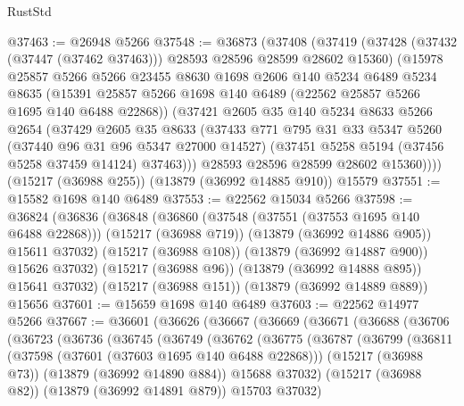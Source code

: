 \begin{lexlean}{RustStd}
\begin{coremodule}
@37463 := @26948 @5266
@37548 := @36873
    (@37408
      (@37419
        (@37428 (@37432 (@37447 (@37462 @37463))) @28593 @28596 @28599 @28602 @15360)
        (@15978
          @25857
          @5266
          @5266
          @23455
          @8630
          @1698
          @2606
          @140
          @5234
          @6489
          @5234
          @8635
          (@15391 @25857 @5266 @1698 @140 @6489 (@22562 @25857 @5266 @1695 @140 @6488 @22868))
          (@37421
            @2605
            @35
            @140
            @5234
            @8633
            @5266
            @2654
            (@37429
              @2605
              @35
              @8633
              (@37433
                @771
                @795
                @31
                @33
                @5347
                @5260
                (@37440 @96 @31 @96 @5347 @27000 @14527)
                (@37451 @5258 @5194 (@37456 @5258 @37459 @14124) @37463)))
            @28593
            @28596
            @28599
            @28602
            @15360))))
    (@15217 (@36988 @255))
    (@13879 (@36992 @14885 @910))
    @15579
@37551 := @15582 @1698 @140 @6489
@37553 := @22562 @15034 @5266
@37598 := @36824
    (@36836
      (@36848
        (@36860
          (@37548 (@37551 (@37553 @1695 @140 @6488 @22868)))
          (@15217 (@36988 @719))
          (@13879 (@36992 @14886 @905))
          @15611
          @37032)
        (@15217 (@36988 @108))
        (@13879 (@36992 @14887 @900))
        @15626
        @37032)
      (@15217 (@36988 @96))
      (@13879 (@36992 @14888 @895))
      @15641
      @37032)
    (@15217 (@36988 @151))
    (@13879 (@36992 @14889 @889))
    @15656
@37601 := @15659 @1698 @140 @6489
@37603 := @22562 @14977 @5266
@37667 := @36601
    (@36626
      (@36667
        (@36669
          (@36671
            (@36688
              (@36706
                (@36723
                  (@36736
                    (@36745
                      (@36749
                        (@36762
                          (@36775
                            (@36787
                              (@36799
                                (@36811
                                  (@37598 (@37601 (@37603 @1695 @140 @6488 @22868)))
                                  (@15217 (@36988 @73))
                                  (@13879 (@36992 @14890 @884))
                                  @15688
                                  @37032)
                                (@15217 (@36988 @82))
                                (@13879 (@36992 @14891 @879))
                                @15703
                                @37032)

\end{coremodule}
\end{lexlean}
